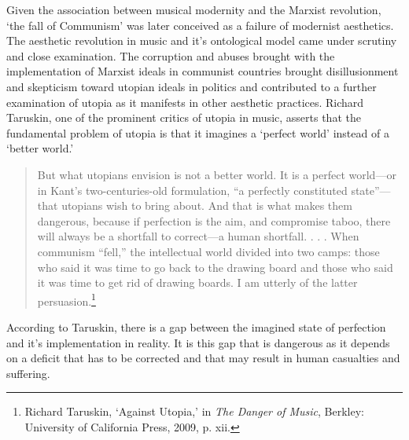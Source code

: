 Given the association between musical modernity and the Marxist revolution, `the fall of Communism' was later conceived as a failure of modernist aesthetics. The aesthetic revolution in music and it's ontological model came under scrutiny and close examination. The corruption and abuses brought with the implementation of Marxist ideals in communist countries brought disillusionment and skepticism toward utopian ideals in politics and contributed to a further examination of utopia as it manifests in other aesthetic practices. Richard Taruskin, one of the prominent critics of utopia in music, asserts that the fundamental problem of utopia is that it imagines a `perfect world' instead of a `better world.'
\begin{quote}
But what utopians envision is not a better world. It is a perfect world---or in Kant's two-centuries-old formulation, ``a perfectly constituted state''---that utopians wish to bring about. And that is what makes them dangerous, because if perfection is the aim, and compromise taboo, there will always be a shortfall to correct---a human shortfall. . . . When communism ``fell,'' the intellectual world divided into two camps: those who said it was time to go back to the drawing board and those who said it was time to get rid of drawing boards. I am utterly of the latter persuasion.\footnote{Richard Taruskin, `Against Utopia,' in \emph{The Danger of Music}, Berkley: University of California Press, 2009, p. xii.}
\end{quote}
According to Taruskin, there is a gap between the imagined state of perfection and it's implementation in reality. It is this gap that is dangerous as it depends on a deficit that has to be corrected and that may result in human casualties and suffering. 

